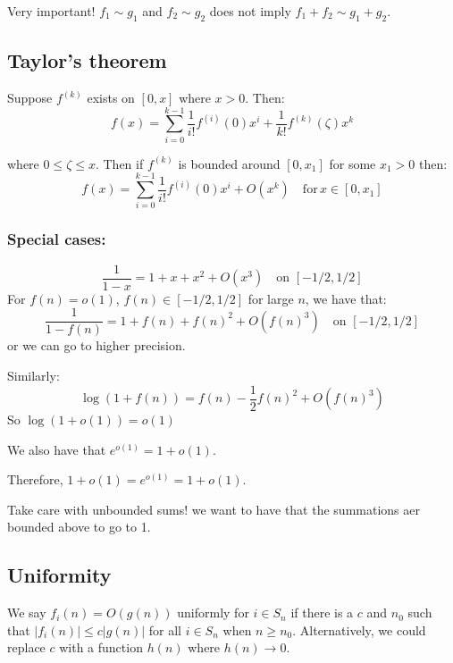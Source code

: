\documentclass[]{article}
\theoremstyle{definition}
\numberwithin{theorem}{section}
\numberwithin{equation}{section}
\begin{document}
Very important! $f_1 \sim g_1$ and $f_2 \sim g_2$ does not imply $f_1 + f_2 \sim g_1 + g_2$. 
\subsection{Taylor's theorem}
Suppose $f^{(k)}$ exists on $[0, x]$ where $x > 0$. Then:
\begin{equation}
	f(x) = \sum_{i = 0}^{k - 1} \frac{1}{i!}f^{(i)}(0) x^i + \frac{1}{k!} f^{(k)}(\zeta) x^k
\end{equation}

where $0 \leq \zeta \leq x$. Then if $f^(k)$ is bounded around $[0, x_1]$ for some $x_1 > 0$ then:
\begin{equation}
	f(x) = \sum_{i = 0}^{k - 1} \frac{1}{i!}f^{(i)}(0) x^i + O(x^k) \quad \text{for} \, x \in [0, x_1]
\end{equation}

\subsubsection{Special cases:}

\begin{equation}
	\frac{1}{1-x} = 1 + x + x^2 + O(x^3) \quad \text{on } [-1/2, 1/2]
\end{equation}
For $f(n) = o(1)$, $f(n) \in [-1/2, 1/2]$ for large $n$, we have that:
\begin{equation}
	\frac{1}{1-f(n)} = 1 + f(n) + f(n)^2 + O(f(n)^3) \quad \text{on } [-1/2, 1/2]
\end{equation}
or we can go to higher precision. 

Similarly:
\begin{equation}
	\log( 1 + f(n)) = f(n) - \frac{1}{2} f(n)^2 + O(f(n)^3)
\end{equation}
So $\log(1 + o(1)) = o(1)$

We also have that $e^{o(1)} = 1 + o(1)$. 

Therefore, $1 + o(1) = e^{o(1)} = 1 + o(1)$. 

Take care with unbounded sums! we want to have that the summations aer bounded above to go to 1. 

\subsection{Uniformity}
We say $f_i(n) = O(g(n))$ uniformly for $i \in S_n$ if there is a $c$ and $n_0$ such that $|f_i(n)| \leq c |g(n)|$ for all $i \in S_n$ when $n \geq n_0$. 
Alternatively, we could replace $c$ with a function $h(n)$ where $h(n) \rightarrow 0$. 
\end{document}
